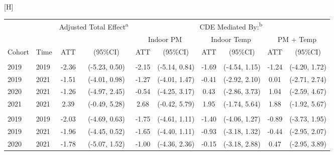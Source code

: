 \documentclass[
  letterpaper,
  DIV=11,
  numbers=noendperiod]{scrartcl}
\makeatletter
\renewenvironment{table}%
   {\renewcommand\familydefault\sfdefault
    \@float{table}}
   {\end@float}
\makeatother
\begin{document}
\hypertarget{tbl-a-bp-med-het}{}
\begin{table}[H]
\caption{\label{tbl-a-bp-med-het}Heterogenous treatment effects for blood pressure mediation model }\tabularnewline

\centering\begingroup\fontsize{10}{12}\selectfont

\begin{threeparttable}
\begin{tabular}{llcccccccc}
\toprule
\multicolumn{2}{c}{ } & \multicolumn{2}{c}{Adjusted Total Effect\textsuperscript{a}} & \multicolumn{6}{c}{CDE Mediated By:\textsuperscript{b}} \\
\cmidrule(l{3pt}r{3pt}){3-4} \cmidrule(l{3pt}r{3pt}){5-10}
\multicolumn{4}{c}{ } & \multicolumn{2}{c}{Indoor PM} & \multicolumn{2}{c}{Indoor Temp} & \multicolumn{2}{c}{PM + Temp} \\
\cmidrule(l{3pt}r{3pt}){5-6} \cmidrule(l{3pt}r{3pt}){7-8} \cmidrule(l{3pt}r{3pt}){9-10}
Cohort & Time & ATT & (95\%CI) & ATT & (95\%CI) & ATT & (95\%CI) & ATT & (95\%CI)\\
\midrule
\addlinespace[0.3em]
\multicolumn{10}{l}{\textbf{Brachial SBP}}\\
\hspace{1em}2019 & 2019 & -2.36 & (-5.23, 0.50) & -2.15 & (-5.14, 0.84) & -1.69 & (-4.54, 1.15) & -1.24 & (-4.20, 1.72)\\
\hspace{1em}2019 & 2021 & -1.51 & (-4.01, 0.98) & -1.27 & (-4.01, 1.47) & -0.41 & (-2.92, 2.10) & 0.01 & (-2.71, 2.74)\\
\hspace{1em}2020 & 2021 & -1.26 & (-4.97, 2.45) & -0.54 & (-4.25, 3.17) & 0.43 & (-2.86, 3.73) & 1.04 & (-2.59, 4.67)\\
\hspace{1em}2021 & 2021 & 2.39 & (-0.49, 5.28) & 2.68 & (-0.42, 5.79) & 1.95 & (-1.74, 5.64) & 1.88 & (-1.92, 5.67)\\
\addlinespace[0.3em]
\multicolumn{10}{l}{\textbf{Central SBP}}\\
\hspace{1em}2019 & 2019 & -2.03 & (-4.69, 0.63) & -1.75 & (-4.61, 1.11) & -1.40 & (-4.06, 1.27) & -0.89 & (-3.73, 1.95)\\
\hspace{1em}2019 & 2021 & -1.96 & (-4.45, 0.52) & -1.65 & (-4.40, 1.11) & -0.93 & (-3.18, 1.32) & -0.44 & (-2.95, 2.07)\\
\hspace{1em}2020 & 2021 & -1.78 & (-5.07, 1.52) & -1.00 & (-4.36, 2.36) & -0.15 & (-3.18, 2.88) & 0.47 & (-2.95, 3.89)\\

\end{tabular}
\end{threeparttable}
\end{table}
\end{document}
